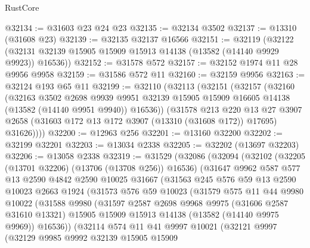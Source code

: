 \begin{lexlean}{RustCore}
\begin{coremodule}
@32134 := @31603 @23 @24 @23
@32135 := @32134 @3502
@32137 := @13310 (@31608 @23)
@32139 := @32135 @32137 @16566
@32151 := @32119
    (@32122 (@32131 @32139 @15905 @15909 @15913 @14138 (@13582 (@14140 @9929 @9923)) @16536))
@32152 := @31578 @572
@32157 := @32152 @1974 @11 @28 @9956 @9958
@32159 := @31586 @572 @11
@32160 := @32159 @9956
@32163 := @32124 @193 @65 @11
@32199 := @32110
    (@32113
      (@32151
        (@32157
          (@32160
            (@32163
              @3502
              @2698
              @9939
              @9951
              @32139
              @15905
              @15909
              @16605
              @14138
              (@13582 (@14140 @9951 @9940))
              @16536))
          (@31578
            @213
            @220
            @13
            @27
            @3907
            @2658
            (@31603 @172 @13 @172 @3907 (@13310 (@31608 @172)) @17695)
            @31626))))
@32200 := @12963 @256
@32201 := @13160 @32200
@32202 := @32199 @32201
@32203 := @13034 @2338
@32205 := @32202 (@13697 @32203)
@32206 := @13058 @2338
@32319 := @31529
    (@32086
      (@32094
        (@32102
          (@32205 (@13701 @32206) (@13706 (@13708 @256)) @16536)
          (@31647
            @9962
            @587
            @577
            @13
            @2590
            @4842
            @2590
            @10025
            @31667
            (@31563
              @245
              @576
              @59
              @13
              @2590
              @10023
              @2663
              @1924
              (@31573
                @576
                @59
                @10023
                (@31579
                  @575
                  @11
                  @44
                  @9980
                  @10022
                  (@31588
                    @9980
                    (@31597
                      @2587
                      @2698
                      @9968
                      @9975
                      (@31606 @2587 @31610 @13321)
                      @15905
                      @15909
                      @15913
                      @14138
                      (@13582 (@14140 @9975 @9969))
                      @16536))
                  (@32114
                    @574
                    @11
                    @41
                    @9997
                    @10021
                    (@32121
                      @9997
                      (@32129
                        @9985
                        @9992
                        @32139
                        @15905
                        @15909

\end{coremodule}
\end{lexlean}
